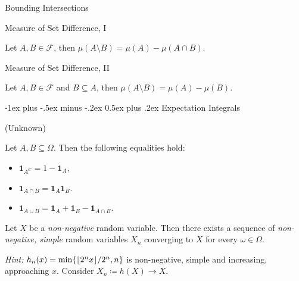 \documentclass[10pt,landscape]{article}
\makeatletter
\newcommand{\Hint}{\textit{Hint: }}
\newcommand{\Indicator}[1]{\mathbf{1}_{#1}}
\newcommand{\CalF}{\mathcal{F}}
\DeclarePairedDelimiter\floor{\lfloor}{\rfloor}
\renewcommand{\section}{\@startsection{section}{1}{0mm}%
                                {-1ex plus -.5ex minus -.2ex}%
                                {0.5ex plus .2ex}%
                                {\normalfont\large\bfseries}}
\makeatother
\begin{document}
\begin{multicols}{3}
\begin{proposition}{}{Bounding Intersections}
\end{proposition}

\begin{proposition}{}{Measure of Set Difference, I}

    Let $A, B \in \CalF$, then $\mu(A \setminus B) = \mu(A) - \mu(A \cap B)$.

\end{proposition}

\begin{proposition}{}{Measure of Set Difference, II}

    Let $A, B \in \CalF$ and $B \subseteq A$, then $\mu(A \setminus B) = \mu(A) - \mu(B)$.

\end{proposition}


\section{Expectation Integrals}

\begin{proposition}{(Unknown)}{}

    Let $A,B \subseteq \Omega$. Then the following equalities hold:

        \begin{itemize}
            \setlength{\parskip}{0em}
            \item $\Indicator{A^C} = 1 - \Indicator{A}$,
            \item $\Indicator{A \cap B} = \Indicator{A}\Indicator{B}$.
            \item $\Indicator{A \cup B} = \Indicator{A} + \Indicator{B} - \Indicator{A \cap B}$.
        \end{itemize}

\end{proposition}

\begin{lemma}{3.3}{}

    Let $X$ be a \emph{non-negative} random variable. Then there exists a sequence of \emph{non-negative, simple} random variables $X_n$ converging to $X$ for every $\omega \in \Omega$.

    \Hint $h_n(x)=\min\{\floor{2^nx}/2^n, n\}$ is non-negative, simple and increasing, approaching $x$. Consider $X_n \coloneqq h(X) \to X$.

\end{lemma}


\end{multicols}
\end{document}

